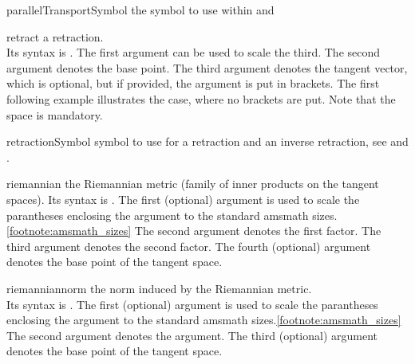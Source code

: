 \documentclass[english,a4paper,DIV=12,parskip=full,oneside]{scrartcl}
\begin{document}
\begin{commandlist}
	\item[parallelTransportSymbol]\hspace*{2em}the symbol to use within \codeCommand{\parallelTransport} and \codeCommand{\parallelTransportDir}
		\par\mathCodeExample{\parallelTransportSymbol}
	\item[retract] a retraction.\\
		Its syntax is .
		The first argument can be used to scale the third.
		The second argument denotes the base point.
		The third argument denotes the tangent vector, which is optional, but
		if provided, the argument is put in brackets. The first following example
		illustrates the case, where no brackets are put. Note that the space is
		mandatory.
		\par{}
		\par{}
		\par{}
	\item[retractionSymbol] symbol to use for a retraction and an inverse retraction,
		see \codeCommand{\retract} and \codeCommand{\inverseRetract}.
		\par\mathCodeExample{\retractionSymbol}
	\item[riemannian] the Riemannian metric (family of inner products on the tangent spaces).
		Its syntax is .
		The first (optional) argument is used to scale the parantheses enclosing the argument to the standard amsmath sizes.\cref{footnote:amsmath_sizes}
		The second argument denotes the first factor.
		The third argument denotes the second factor.
		The fourth (optional) argument denotes the base point of the tangent space.
		\par{}
		\par{}
		\par{}
	\item[riemanniannorm] the norm induced by the Riemannian metric.\\
		Its syntax is .
		The first (optional) argument is used to scale the parantheses enclosing the argument to the standard amsmath sizes.\cref{footnote:amsmath_sizes}
		The second argument denotes the argument.
		The third (optional) argument denotes the base point of the tangent space.
		\par{}

\end{commandlist}
\end{document}
